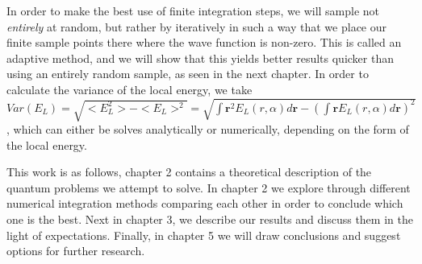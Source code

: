 In order to make the best use of finite integration steps, we will sample not \textit{entirely} at random, but rather by
iteratively in such a way that we place our finite sample points there where the wave function is non-zero. This is called
an adaptive method, and we will show that this yields better results quicker than using an entirely random sample, as seen in the next chapter.
In order to calculate the variance of the local energy, we take
$Var(E_L) = \sqrt{<E_L^2> - <E_L>^2} = \sqrt{ \int \textbf{r}^2 E_L(\textit{r},\alpha) d\textbf{r} -
(\int \textbf{r} E_L(\textit{r},\alpha)d\textbf{r})^2 } $,
which can either be solves analytically or numerically, depending on the form of the local energy.


This work is as follows, chapter 2 contains a theoretical description of the quantum problems
we attempt to solve.
In chapter 2 we explore through different numerical integration methods comparing each other in order to
conclude which one is the best.
Next in chapter 3, we describe our results and discuss them in the light
of expectations.
Finally, in chapter 5 we will draw conclusions and suggest options for further research.
